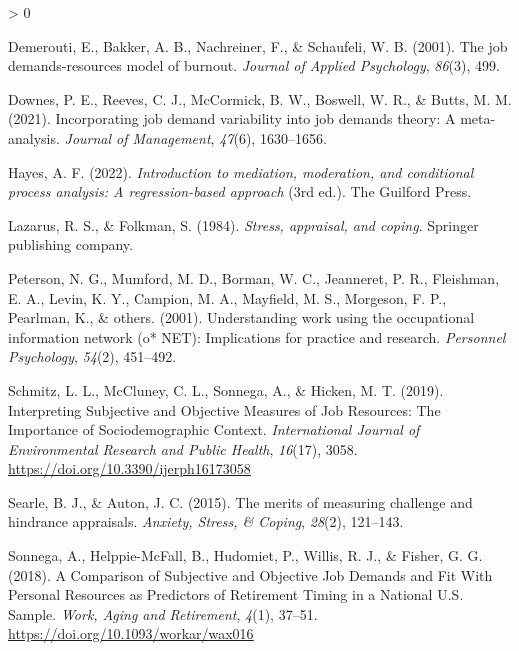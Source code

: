 \documentclass[
  english,
  man]{apa6}
\newlength{\cslhangindent}
\newenvironment{CSLReferences}[2] %
 {%
  \setlength{\parindent}{0pt}
  \ifodd #1 \everypar{\setlength{\hangindent}{\cslhangindent}}\ignorespaces\fi
  \ifnum #2 > 0
  \setlength{\parskip}{#2\baselineskip}
  \fi
 }%
 {}
\begin{document}
\begin{CSLReferences}{1}{0}
\leavevmode\hypertarget{ref-demerouti2001job}{}%
Demerouti, E., Bakker, A. B., Nachreiner, F., \& Schaufeli, W. B. (2001). The job demands-resources model of burnout. \emph{Journal of Applied Psychology}, \emph{86}(3), 499.

\leavevmode\hypertarget{ref-downes2021incorporating}{}%
Downes, P. E., Reeves, C. J., McCormick, B. W., Boswell, W. R., \& Butts, M. M. (2021). Incorporating job demand variability into job demands theory: A meta-analysis. \emph{Journal of Management}, \emph{47}(6), 1630--1656.

\leavevmode\hypertarget{ref-hayes2022}{}%
Hayes, A. F. (2022). \emph{Introduction to mediation, moderation, and conditional process analysis: A regression-based approach} (3rd ed.). The Guilford Press.

\leavevmode\hypertarget{ref-lazarus1984stress}{}%
Lazarus, R. S., \& Folkman, S. (1984). \emph{Stress, appraisal, and coping}. Springer publishing company.

\leavevmode\hypertarget{ref-peterson2001understanding}{}%
Peterson, N. G., Mumford, M. D., Borman, W. C., Jeanneret, P. R., Fleishman, E. A., Levin, K. Y., Campion, M. A., Mayfield, M. S., Morgeson, F. P., Pearlman, K., \& others. (2001). Understanding work using the occupational information network (o* NET): Implications for practice and research. \emph{Personnel Psychology}, \emph{54}(2), 451--492.

\leavevmode\hypertarget{ref-schmitz_interpreting_2019}{}%
Schmitz, L. L., McCluney, C. L., Sonnega, A., \& Hicken, M. T. (2019). Interpreting {Subjective} and {Objective} {Measures} of {Job} {Resources}: {The} {Importance} of {Sociodemographic} {Context}. \emph{International Journal of Environmental Research and Public Health}, \emph{16}(17), 3058. \url{https://doi.org/10.3390/ijerph16173058}

\leavevmode\hypertarget{ref-searle2015merits}{}%
Searle, B. J., \& Auton, J. C. (2015). The merits of measuring challenge and hindrance appraisals. \emph{Anxiety, Stress, \& Coping}, \emph{28}(2), 121--143.

\leavevmode\hypertarget{ref-sonnega_comparison_2018}{}%
Sonnega, A., Helppie-McFall, B., Hudomiet, P., Willis, R. J., \& Fisher, G. G. (2018). A {Comparison} of {Subjective} and {Objective} {Job} {Demands} and {Fit} {With} {Personal} {Resources} as {Predictors} of {Retirement} {Timing} in a {National} {U}.{S}. {Sample}. \emph{Work, Aging and Retirement}, \emph{4}(1), 37--51. \url{https://doi.org/10.1093/workar/wax016}


\end{CSLReferences}
\end{document}

